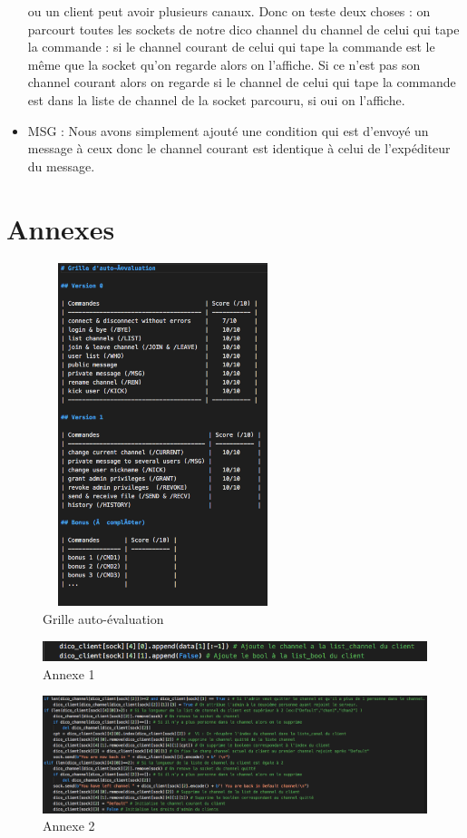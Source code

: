 \documentclass[12pt]{article}
\begin{document}
\begin{itemize}
    ou un client peut avoir plusieurs canaux. Donc on teste deux choses : on parcourt toutes les sockets de notre dico channel du channel de celui qui tape la commande : si le channel courant de celui qui tape la commande est le même que la socket
    qu'on regarde alors on l'affiche. Si ce n'est pas son channel courant alors on regarde si le channel de celui qui tape la commande est dans la liste de channel de la socket parcouru, si oui on l'affiche.
    \item MSG : Nous avons simplement ajouté une condition qui est d'envoyé un message à ceux donc le channel courant est identique à celui de l'expéditeur du message.\\
\end{itemize}

\section{Annexes}

\begin{figure}
\begin{center}
\includegraphics[height=10cm,width=7cm]{grille.png} 
\end{center}
\caption{Grille auto-évaluation}
\label{Grille auto-évaluation}
\end{figure}

\begin{figure}
\begin{center}
\includegraphics[width=15cm]{annexe1.png} 
\end{center}
\caption{Annexe 1}
\label{Annexe 1}
\end{figure}

\begin{figure}
\begin{center}
\includegraphics[width=15cm]{annexe2.png} 
\end{center}
\caption{Annexe 2}
\label{Annexe 2}
\end{figure}
            
\end{document}
